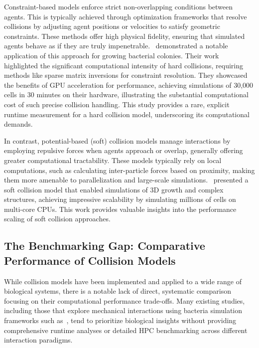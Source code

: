 \documentclass[conference]{IEEEtran}
\begin{document}
\begin{description}[style=nextline]
    \item[Constraint-Based (Hard) Collision Models]
        Constraint-based models enforce strict non-overlapping conditions between agents. This is typically achieved through optimization frameworks that resolve collisions by adjusting agent positions or velocities to satisfy geometric constraints. These methods offer high physical fidelity, ensuring that simulated agents behave as if they are truly impenetrable.~\cite{Rudge2012} demonstrated a notable application of this approach for growing bacterial colonies. Their work highlighted the significant computational intensity of hard collisions, requiring methods like sparse matrix inversions for constraint resolution. They showcased the benefits of GPU acceleration for performance, achieving simulations of 30,000 cells in 30 minutes on their hardware, illustrating the substantial computational cost of such precise collision handling. This study provides a rare, explicit runtime measurement for a hard collision model, underscoring its computational demands.

    \item[Potential-Based (Soft) Collision Models]
        In contrast, potential-based (soft) collision models manage interactions by employing repulsive forces when agents approach or overlap, generally offering greater computational tractability. These models typically rely on local computations, such as calculating inter-particle forces based on proximity, making them more amenable to parallelization and large-scale simulations.~\cite{Warren2019} presented a soft collision model that enabled simulations of 3D growth and complex structures, achieving impressive scalability by simulating millions of cells on multi-core CPUs. This work provides valuable insights into the performance scaling of soft collision approaches.
\end{description}

\subsection{The Benchmarking Gap: Comparative Performance of Collision Models}

While collision models have been implemented and applied to a wide range of biological systems, there is a notable lack of direct, systematic comparison focusing on their computational performance trade-offs. Many existing studies, including those that explore mechanical interactions using bacteria simulation frameworks such as~\cite{Rudge2012,Weady2024,Blanchard2015,Ghosh2015,You2018,Warren2019,Khan_2024}, tend to prioritize biological insights without providing comprehensive runtime analyses or detailed HPC benchmarking across different interaction paradigms.
\end{document}
